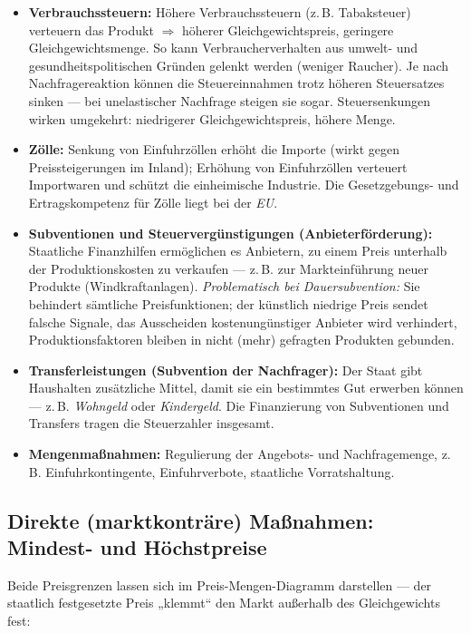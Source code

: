 \documentclass[11pt, a4paper]{article}
\begin{document}
\begin{itemize}
  \item \textbf{Verbrauchssteuern:} Höhere Verbrauchssteuern (z.\,B. Tabaksteuer)
    verteuern das Produkt $\Rightarrow$ höherer Gleichgewichtspreis, geringere
    Gleichgewichtsmenge. So kann Verbraucherverhalten aus umwelt- und
    gesundheitspolitischen Gründen gelenkt werden (weniger Raucher). Je nach
    Nachfragereaktion können die Steuereinnahmen trotz höheren Steuersatzes sinken ---
    bei unelastischer Nachfrage steigen sie sogar. Steuersenkungen wirken umgekehrt:
    niedrigerer Gleichgewichtspreis, höhere Menge.
  \item \textbf{Zölle:} Senkung von Einfuhrzöllen erhöht die Importe (wirkt gegen
    Preissteigerungen im Inland); Erhöhung von Einfuhrzöllen verteuert Importwaren und
    schützt die einheimische Industrie. Die Gesetzgebungs- und Ertragskompetenz für Zölle
    liegt bei der \emph{EU}.
  \item \textbf{Subventionen und Steuervergünstigungen (Anbieterförderung):} Staatliche
    Finanzhilfen ermöglichen es Anbietern, zu einem Preis unterhalb der
    Produktionskosten zu verkaufen --- z.\,B. zur Markteinführung neuer Produkte
    (Windkraftanlagen). \emph{Problematisch bei Dauersubvention:} Sie behindert sämtliche
    Preisfunktionen; der künstlich niedrige Preis sendet falsche Signale, das Ausscheiden
    kostenungünstiger Anbieter wird verhindert, Produktionsfaktoren bleiben in nicht
    (mehr) gefragten Produkten gebunden.
  \item \textbf{Transferleistungen (Subvention der Nachfrager):} Der Staat gibt Haushalten
    zusätzliche Mittel, damit sie ein bestimmtes Gut erwerben können --- z.\,B.
    \emph{Wohngeld} oder \emph{Kindergeld}. Die Finanzierung von Subventionen und
    Transfers tragen die Steuerzahler insgesamt.
  \item \textbf{Mengenmaßnahmen:} Regulierung der Angebots- und Nachfragemenge, z.\,B.
    Einfuhrkontingente, Einfuhrverbote, staatliche Vorratshaltung.
\end{itemize}

\subsection{Direkte (marktkonträre) Maßnahmen: Mindest- und Höchstpreise}

Beide Preisgrenzen lassen sich im Preis-Mengen-Diagramm darstellen --- der staatlich
festgesetzte Preis „klemmt`` den Markt außerhalb des Gleichgewichts fest:
\end{document}
